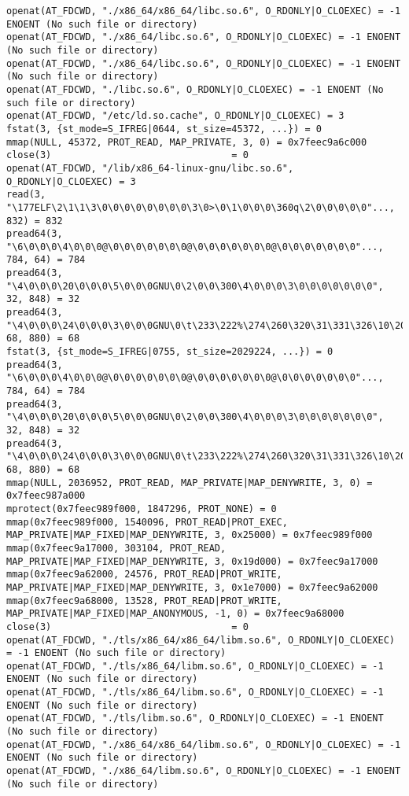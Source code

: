 \documentclass[pdf, unicode, 12pt, a4paper,oneside,fleqn]{article}
\begin{document}
{\begin{verbatim}
openat(AT_FDCWD, "./x86_64/x86_64/libc.so.6", O_RDONLY|O_CLOEXEC) = -1 ENOENT (No such file or directory)
openat(AT_FDCWD, "./x86_64/libc.so.6", O_RDONLY|O_CLOEXEC) = -1 ENOENT (No such file or directory)
openat(AT_FDCWD, "./x86_64/libc.so.6", O_RDONLY|O_CLOEXEC) = -1 ENOENT (No such file or directory)
openat(AT_FDCWD, "./libc.so.6", O_RDONLY|O_CLOEXEC) = -1 ENOENT (No such file or directory)
openat(AT_FDCWD, "/etc/ld.so.cache", O_RDONLY|O_CLOEXEC) = 3
fstat(3, {st_mode=S_IFREG|0644, st_size=45372, ...}) = 0
mmap(NULL, 45372, PROT_READ, MAP_PRIVATE, 3, 0) = 0x7feec9a6c000
close(3)                                = 0
openat(AT_FDCWD, "/lib/x86_64-linux-gnu/libc.so.6", O_RDONLY|O_CLOEXEC) = 3
read(3, "\177ELF\2\1\1\3\0\0\0\0\0\0\0\0\3\0>\0\1\0\0\0\360q\2\0\0\0\0\0"..., 832) = 832
pread64(3, "\6\0\0\0\4\0\0\0@\0\0\0\0\0\0\0@\0\0\0\0\0\0\0@\0\0\0\0\0\0\0"..., 784, 64) = 784
pread64(3, "\4\0\0\0\20\0\0\0\5\0\0\0GNU\0\2\0\0\300\4\0\0\0\3\0\0\0\0\0\0\0", 32, 848) = 32
pread64(3, "\4\0\0\0\24\0\0\0\3\0\0\0GNU\0\t\233\222%\274\260\320\31\331\326\10\204\276X>\263"..., 68, 880) = 68
fstat(3, {st_mode=S_IFREG|0755, st_size=2029224, ...}) = 0
pread64(3, "\6\0\0\0\4\0\0\0@\0\0\0\0\0\0\0@\0\0\0\0\0\0\0@\0\0\0\0\0\0\0"..., 784, 64) = 784
pread64(3, "\4\0\0\0\20\0\0\0\5\0\0\0GNU\0\2\0\0\300\4\0\0\0\3\0\0\0\0\0\0\0", 32, 848) = 32
pread64(3, "\4\0\0\0\24\0\0\0\3\0\0\0GNU\0\t\233\222%\274\260\320\31\331\326\10\204\276X>\263"..., 68, 880) = 68
mmap(NULL, 2036952, PROT_READ, MAP_PRIVATE|MAP_DENYWRITE, 3, 0) = 0x7feec987a000
mprotect(0x7feec989f000, 1847296, PROT_NONE) = 0
mmap(0x7feec989f000, 1540096, PROT_READ|PROT_EXEC, MAP_PRIVATE|MAP_FIXED|MAP_DENYWRITE, 3, 0x25000) = 0x7feec989f000
mmap(0x7feec9a17000, 303104, PROT_READ, MAP_PRIVATE|MAP_FIXED|MAP_DENYWRITE, 3, 0x19d000) = 0x7feec9a17000
mmap(0x7feec9a62000, 24576, PROT_READ|PROT_WRITE, MAP_PRIVATE|MAP_FIXED|MAP_DENYWRITE, 3, 0x1e7000) = 0x7feec9a62000
mmap(0x7feec9a68000, 13528, PROT_READ|PROT_WRITE, MAP_PRIVATE|MAP_FIXED|MAP_ANONYMOUS, -1, 0) = 0x7feec9a68000
close(3)                                = 0
openat(AT_FDCWD, "./tls/x86_64/x86_64/libm.so.6", O_RDONLY|O_CLOEXEC) = -1 ENOENT (No such file or directory)
openat(AT_FDCWD, "./tls/x86_64/libm.so.6", O_RDONLY|O_CLOEXEC) = -1 ENOENT (No such file or directory)
openat(AT_FDCWD, "./tls/x86_64/libm.so.6", O_RDONLY|O_CLOEXEC) = -1 ENOENT (No such file or directory)
openat(AT_FDCWD, "./tls/libm.so.6", O_RDONLY|O_CLOEXEC) = -1 ENOENT (No such file or directory)
openat(AT_FDCWD, "./x86_64/x86_64/libm.so.6", O_RDONLY|O_CLOEXEC) = -1 ENOENT (No such file or directory)
openat(AT_FDCWD, "./x86_64/libm.so.6", O_RDONLY|O_CLOEXEC) = -1 ENOENT (No such file or directory)

\end{verbatim}}
\end{document}
